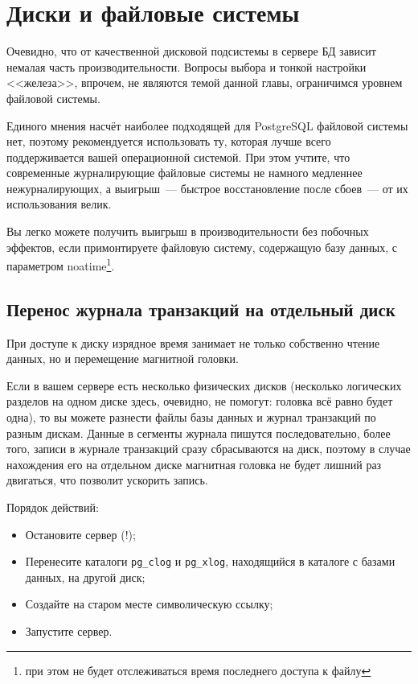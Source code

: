 \section{Диски и файловые системы}
\label{sec:hard-drive-and-file-systems}

Очевидно, что от качественной дисковой подсистемы в сервере БД зависит немалая часть производительности. Вопросы выбора и тонкой настройки <<железа>>, впрочем, не являются темой данной главы, ограничимся уровнем файловой системы.

Единого мнения насчёт наиболее подходящей для PostgreSQL файловой системы нет, поэтому рекомендуется использовать ту, которая лучше всего поддерживается вашей операционной системой. При этом учтите, что современные журналирующие файловые системы не намного медленнее нежурналирующих, а выигрыш~--- быстрое восстановление после сбоев~--- от их использования велик.

Вы легко можете получить выигрыш в производительности без побочных эффектов, если примонтируете файловую систему, содержащую базу данных, с параметром noatime\footnote{при этом не будет отслеживаться время последнего доступа к файлу}.


\subsection{Перенос журнала транзакций на отдельный диск}

При доступе к диску изрядное время занимает не только собственно чтение данных, но и перемещение магнитной головки.

Если в вашем сервере есть несколько физических дисков (несколько логических разделов на одном диске здесь, очевидно, не помогут: головка всё равно будет одна), то вы можете разнести файлы базы данных и журнал транзакций по разным дискам. Данные в сегменты журнала пишутся последовательно, более того, записи в журнале транзакций сразу сбрасываются на диск, поэтому в случае нахождения его на отдельном диске магнитная головка не будет лишний раз двигаться, что позволит ускорить запись.

Порядок действий:

\begin{itemize}
  \item Остановите сервер (!);
  \item Перенесите каталоги \lstinline!pg_clog! и \lstinline!pg_xlog!, находящийся в каталоге с базами данных, на другой диск;
  \item Создайте на старом месте символическую ссылку;
  \item Запустите сервер.
\end{itemize}

